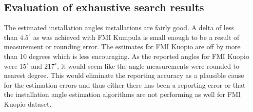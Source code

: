 







\newpage
\subsection{Evaluation of exhaustive search results}
The estimated installation angles installations are fairly good. A delta of less than $4.5^\circ$ as was achieved with FMI Kumpula is small enough to be a result of measurement or rounding error. The estimates for FMI Kuopio are off by more than 10 degrees which is less encouraging. As the reported angles for FMI Kuopio were $15^\circ$ and $217^\circ$, it would seem like the angle measurements were rounded to nearest degree. This would eliminate the reporting accuracy as a plausible cause for the estimation errors and thus either there has been a reporting error or that the installation angle estimation algorithms are not performing as well for FMI Kuopio dataset.



